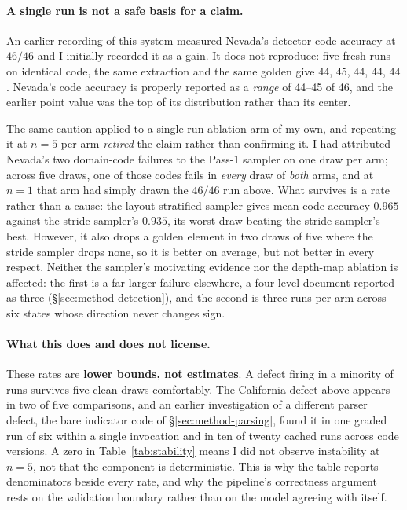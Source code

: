 \paragraph{A single run is not a safe basis for a claim.} An earlier recording of this system measured Nevada's detector code
accuracy at $46/46$ and I initially recorded it as a gain. It does not
reproduce: five fresh runs on identical code, the same extraction and the same
golden give $44$, $45$, $44$, $44$, $44$. Nevada's code accuracy is properly
reported as a \emph{range} of 44--45 of 46, and the earlier point value was the
top of its distribution rather than its center.

The same caution applied to a single-run ablation arm of my own, and repeating
it at $n{=}5$ per arm \emph{retired} the claim rather than confirming it. I had
attributed Nevada's two domain-code failures to the Pass-1 sampler on one draw
per arm; across five draws, one of those codes fails in \emph{every} draw of
\emph{both} arms, and at $n{=}1$ that arm had simply drawn the $46/46$ run
above. What survives is a rate rather than a cause: the layout-stratified
sampler gives mean code accuracy $0.965$ against the stride sampler's $0.935$,
its worst draw beating the stride sampler's best. However, it also drops a golden
element in two draws of five where the stride sampler drops none, so it is
better on average, but not better in every respect. Neither the sampler's
motivating evidence nor the depth-map ablation is affected: the first is a far
larger failure elsewhere, a four-level document reported as three
(\S\ref{sec:method-detection}), and the second is three runs per arm across six
states whose direction never changes sign.

\paragraph{What this does and does not license.} These rates are \textbf{lower
bounds, not estimates}. A defect firing in a minority of runs survives five
clean draws comfortably. The California defect above appears in two of five
comparisons, and an earlier investigation of a different parser defect, the
bare indicator code of \S\ref{sec:method-parsing}, found it in one graded run
of six within a single invocation and in ten of twenty cached runs across code
versions. A zero in Table~\ref{tab:stability} means I did not
observe instability at $n{=}5$, not that the component is deterministic. This is
why the table reports denominators beside every rate, and why the pipeline's
correctness argument rests on the validation boundary rather than on the model
agreeing with itself.

